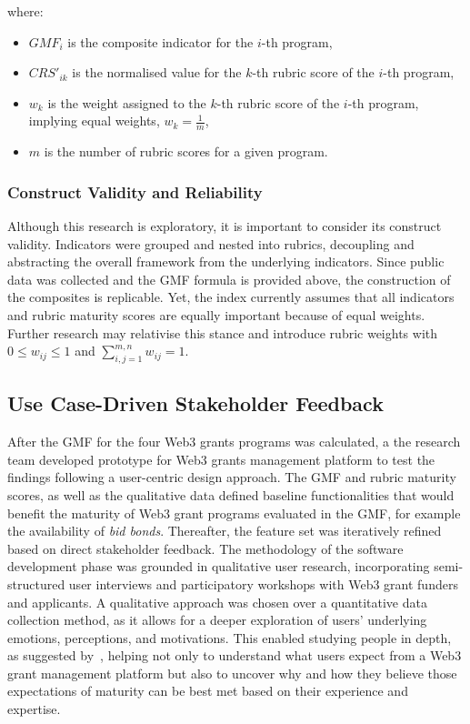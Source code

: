 \documentclass[conference]{IEEEtran}
\begin{document}
where:

\begin{itemize}
    \item \( GMF_i \) is the composite indicator for the \( i \)-th program,
    \item \( CRS'_{ik} \) is the normalised value for the \( k \)-th rubric score of the \( i \)-th program,
    \item \( w_k \) is the weight assigned to the \( k \)-th rubric score of the \( i \)-th program, implying equal weights, \( w_k = \frac{1}{m} \),
    \item \( m \) is the number of rubric scores for a given program.
\end{itemize}\vspace{7pt}
\normalsize

\subsubsection{Construct Validity and Reliability}\label{sec_3.2.3}

Although this research is exploratory, it is important to consider its construct validity. Indicators were grouped and nested into rubrics, decoupling and abstracting the overall framework from the underlying indicators. Since public data was collected and the GMF formula is provided above, the construction of the composites is replicable. Yet, the index currently assumes that all indicators and rubric maturity scores are equally important because of equal weights. Further research may relativise this stance and introduce rubric weights with \( 0 \leq w_{ij} \leq 1 \) and \( \sum_{i,j=1}^{m,n} w_{ij} = 1\).

\subsection{Use Case-Driven Stakeholder Feedback}\label{sec_3.3}

After the GMF for the four Web3 grants programs was calculated, a the research team developed prototype for Web3 grants management platform to test the findings following a user-centric design approach. The GMF and rubric maturity scores, as well as the qualitative data defined baseline functionalities that would benefit the maturity of Web3 grant programs evaluated in the GMF, for example the availability of \textit{bid bonds}. Thereafter, the feature set was iteratively refined based on direct stakeholder feedback. The methodology of the software development phase was grounded in qualitative user research, incorporating semi-structured user interviews and participatory workshops with Web3 grant funders and applicants. A qualitative approach was chosen over a quantitative data collection method, as it allows for a deeper exploration of users' underlying emotions, perceptions, and motivations. This enabled studying people in depth, as suggested by~\cite{norman_design_2013}, helping not only to understand what users expect from a Web3 grant management platform but also to uncover why and how they believe those expectations of maturity can be best met based on their experience and expertise.
\end{document}
